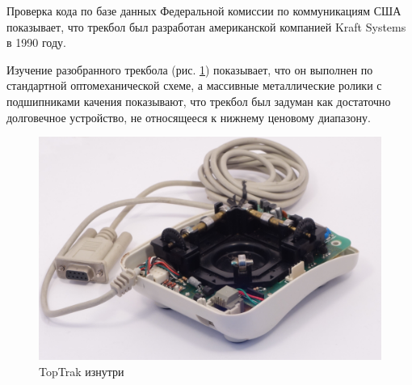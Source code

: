 \documentclass[11pt, a4paper]{article}
\begin{document}
Проверка кода по базе данных Федеральной комиссии по коммуникациям США показывает, что трекбол был разработан американской компанией Kraft Systems в 1990 году.

Изучение разобранного трекбола (рис. \ref{fig:TopTrakInside}) показывает, что он выполнен по стандартной оптомеханической схеме, а массивные металлические ролики с подшипниками качения показывают, что трекбол был задуман как достаточно долговечное устройство, не относящееся к нижнему ценовому диапазону.

\begin{figure}[h]
    \centering
    \includegraphics[scale=0.5]{1990_kraft_toptrack/200.jpg}
    \caption{TopTrak изнутри}
    \label{fig:TopTrakInside}
\end{figure}
\end{document}
